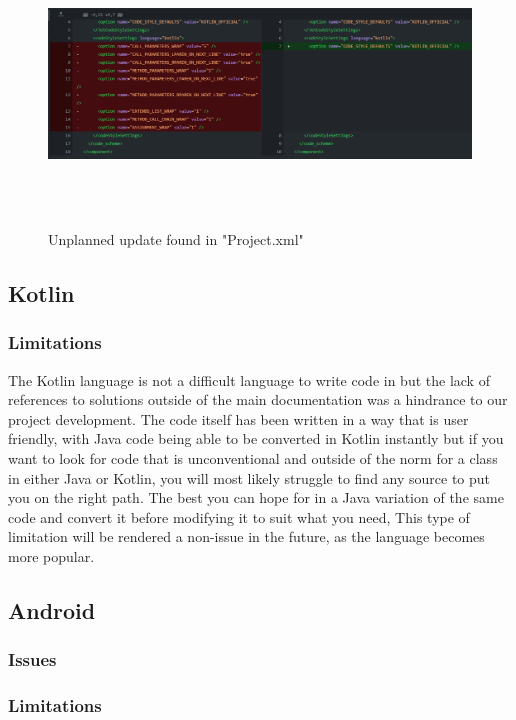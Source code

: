 \begin{figure}[H]
    \centering
    \includegraphics[width=16cm, height = 7.5cm]{img/Unplannedupdate.png}
    \caption{Unplanned update found in "Project.xml"}
    \label{fig:altas config}
\end{figure}

\subsection{Kotlin}
\subsubsection{Limitations}
The Kotlin language is not a difficult language to write code in but the lack of references to solutions outside of the main documentation was a hindrance to our project development. The code itself has been written in a way that is user friendly, with Java code being able to be converted in Kotlin instantly but if you want to look for code that is unconventional and outside of the norm for a class in either Java or Kotlin, you will most likely struggle to find any source to put you on the right path. The best you can hope for in a Java variation of the same code and convert it before modifying it to suit what you need,
This type of limitation will be rendered a non-issue in the future, as the language becomes more popular. 
\subsection{Android}
\subsubsection{Issues}
\subsubsection{Limitations}
